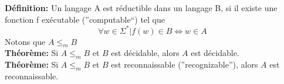 \documentclass[a4paper,12pt]{article}
\begin{document}
  \textbf{Définition:} Un langage A est réductible dans un langage B, si il existe une fonction f exécutable (''computable``) tel que
  $$\forall w \in \Sigma^* | f(w) \in B \Leftrightarrow w \in A$$
  Notons que $A \leq_m B$\\
  
  \textbf{Théorème:} Si $A \leq_m B$ et $B$ est décidable, alors $A$ est décidable.\\
  
  \textbf{Théorème:} Si $A \leq_m B$ et $B$ est reconnaissable (''recognizable''), alors $A$ est reconnaissable.
  
  
  
\end{document}
